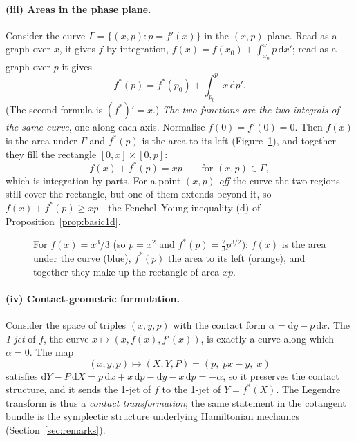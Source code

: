 \documentclass[11pt,a4paper]{article}
\newcommand{\dd}{\mathrm{d}}
\theoremstyle{plain}
\theoremstyle{definition}
\theoremstyle{remark}
\begin{document}
\paragraph{(iii) Areas in the phase plane.}
Consider the curve $\Gamma=\{(x,p):p=f'(x)\}$ in the $(x,p)$-plane.  Read as
a graph over $x$, it gives $f$ by integration,
$f(x)=f(x_0)+\int_{x_0}^{x}p\,\dd x'$; read as a graph over $p$ it gives
\[
  f^*(p)=f^*(p_0)+\int_{p_0}^{p}x\,\dd p' .
\]
(The second formula is $(f^*)'=x$.)  \emph{The two functions are the two
integrals of the same curve}, one along each axis.  Normalise $f(0)=f'(0)=0$.
Then $f(x)$ is the area under $\Gamma$ and $f^*(p)$ is the area to its left
(Figure~\ref{fig:areas}), and together they fill the rectangle $[0,x]\times[0,p]$:
\[
  f(x)+f^*(p)=xp\qquad\text{for }(x,p)\in\Gamma,
\]
which is integration by parts.  For a point $(x,p)$ \emph{off} the curve the
two regions still cover the rectangle, but one of them extends beyond it, so
$f(x)+f^*(p)\ge xp$---the Fenchel--Young inequality (d) of
Proposition~\ref{prop:basic1d}.

\begin{figure}[ht]
\centering
{}
\caption{For $f(x)=x^3/3$ (so $p=x^2$ and $f^*(p)=\tfrac23p^{3/2}$): $f(x)$ is
the area under the curve (blue), $f^*(p)$ the area to its left (orange), and
together they make up the rectangle of area $xp$.}
\label{fig:areas}
\end{figure}

\paragraph{(iv) Contact-geometric formulation.}
Consider the space of triples $(x,y,p)$ with the contact form
$\alpha=\dd y-p\,\dd x$.  The \emph{1-jet} of $f$, the curve
$x\mapsto(x,f(x),f'(x))$, is exactly a curve along which $\alpha=0$.  The map
\[
  (x,y,p)\longmapsto (X,Y,P)=(p,\;px-y,\;x)
\]
satisfies $\dd Y-P\,\dd X=p\,\dd x+x\,\dd p-\dd y-x\,\dd p=-\alpha$, so it
preserves the contact structure, and it sends the 1-jet of $f$ to the 1-jet of
$Y=f^*(X)$.  The Legendre transform is thus a \emph{contact transformation};
the same statement in the cotangent bundle is the symplectic structure
underlying Hamiltonian mechanics (Section~\ref{sec:remarks}).
\end{document}
